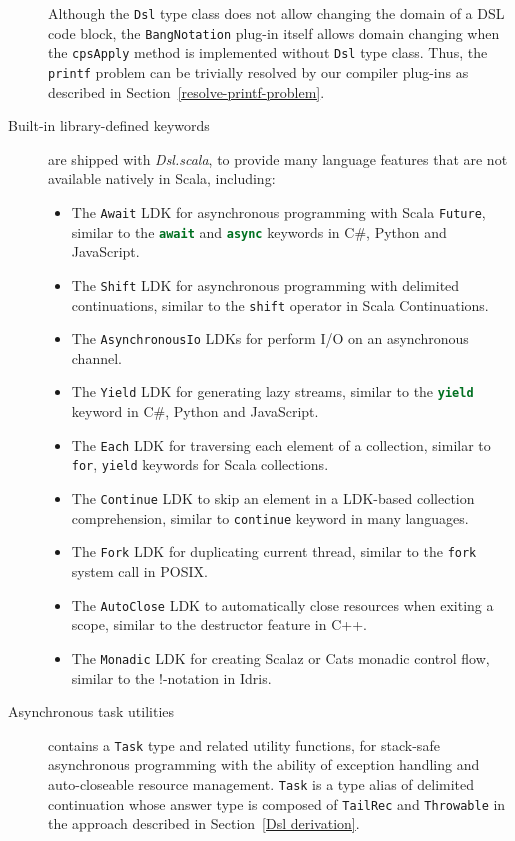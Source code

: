 \begin{description}
  Although the \lstinline{Dsl} type class does not allow changing the domain of a DSL code block, the \lstinline{BangNotation} plug-in itself allows domain changing when the \lstinline{cpsApply} method is implemented without \lstinline{Dsl} type class. Thus, the \lstinline{printf} problem can be trivially resolved by our compiler plug-ins as described in Section~\ref{resolve-printf-problem}.
  \item[Built-in library-defined keywords] are shipped with \textit{Dsl.scala}, to provide many language features that are not available natively in Scala, including:
  \begin{itemize}
    \item The \lstinline{Await} LDK for asynchronous programming with Scala \lstinline{Future}, similar to the \lstinline[language=Python,style=Python3]{await} and \lstinline[language=Python,style=Python3]{async} keywords in C\#, Python and JavaScript.
    \item The \lstinline{Shift} LDK for asynchronous programming with delimited continuations, similar to the \lstinline{shift} operator in Scala Continuations.
    \item The \lstinline{AsynchronousIo} LDKs for perform I/O on an asynchronous channel.
    \item The \lstinline{Yield} LDK for generating lazy streams, similar to the \lstinline[language=Python,style=Python3]{yield} keyword in C\#, Python and JavaScript.
    \item The \lstinline{Each} LDK for traversing each element of a collection, similar to \lstinline{for}, \lstinline{yield} keywords for Scala collections.
    \item The \lstinline{Continue} LDK to skip an element in a LDK-based collection comprehension, similar to \lstinline{continue} keyword in many languages.
    \item The \lstinline{Fork} LDK for duplicating current thread, similar to the \lstinline{fork} system call in POSIX.
    \item The \lstinline{AutoClose} LDK to automatically close resources when exiting a scope, similar to the destructor feature in C++.
    \item The \lstinline{Monadic} LDK for creating Scalaz \cite{kenji2017scalaz} or Cats \cite{typelevel2017cats} monadic control flow, similar to the !-notation in Idris\cite{brady2013idris}.
  \end{itemize}
  \item[Asynchronous task utilities] contains a \lstinline{Task} type and related utility functions, for stack-safe asynchronous programming with the ability of exception handling and auto-closeable resource management. \lstinline{Task} is a type alias of delimited continuation whose answer type is composed of \lstinline{TailRec} and \lstinline{Throwable} in the approach described in Section~\ref{Dsl derivation}.


\end{description}
